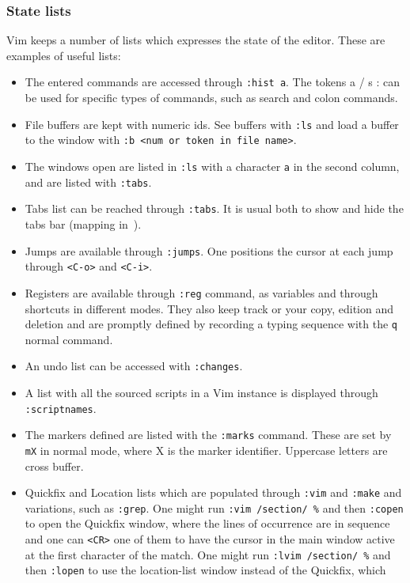 \documentclass{article}
\newcommand{\ttt}[1] {
	\texttt{<#1>}}
\newcommand{\tttt}[1] {
	\texttt{#1}}
\begin{document}
\subsubsection{State lists}\label{state}
Vim keeps a number of lists which expresses the state of the editor.
These are examples of useful lists:
\begin{itemize}
	\item The entered commands are accessed through \tttt{:hist a}. 
    The tokens a / s : can be used for specific types of commands, such
		as search and colon commands.
	\item File buffers are kept with numeric ids. See buffers with \tttt{:ls} and load a buffer to the window with \tttt{:b <num or token in file name>}.
  \item The windows open are listed in \tttt{:ls} with a character \tttt{a} in the second column, and are listed with \tttt{:tabs}.
	\item Tabs list can be reached through \tttt{:tabs}.
		It is usual both to show and hide the tabs bar (mapping in~\cite{vimrc}).
	\item Jumps are available through \tttt{:jumps}.
		One positions the cursor at each jump through \ttt{C-o} and \ttt{C-i}.
  \item Registers are available through \tttt{:reg} command, as variables and through shortcuts in different modes.
    They also keep track or your copy, edition and deletion and are promptly defined
    by recording a typing sequence with the \tttt{q} normal command.
	\item An undo list can be accessed with \tttt{:changes}.
	\item A list with all the sourced scripts in a Vim instance is displayed through \tttt{:scriptnames}.
	\item The markers defined are listed with the \tttt{:marks} command.
		These are set by \tttt{mX} in normal mode, where X is the marker identifier.
		Uppercase letters are cross buffer.
	\item Quickfix and Location lists which are populated through \tttt{:vim} and \tttt{:make}
		and variations, such as \tttt{:grep}.
		One might run \tttt{:vim /section/ \%} and then \tttt{:copen}
		to open the Quickfix window, where the lines of occurrence are in sequence
		and one can \ttt{CR} one of them to have the cursor in the main window active at
		the first character of the match.
		One might run \tttt{:lvim /section/ \%} and then \tttt{:lopen}
		to use the location-list window instead of the Quickfix, which

\end{itemize}
\end{document}
